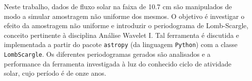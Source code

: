 
\begin{resumo}


\hypertarget{estilo:resumo}{} %

Neste trabalho, dados de fluxo solar na faixa de 10.7 cm são manipulados de modo a simular amostragem não uniforme dos mesmos. O objetivo é investigar o efeito da amostragem não uniforme e introduzir o periodograma de Lomb-Scargle, conceito pertinente à disciplina Análise Wavelet I. Tal ferramenta é discutida e implementada a partir do pacote \texttt{astropy} (da linguagem \texttt{Python}) com a classe \texttt{LombScargle}. Os diferentes periodogramas gerados são analisados e a performance da ferramenta investigada à luz do conhecido ciclo de atividade solar, cujo período é de onze anos. %

 
\end{resumo}